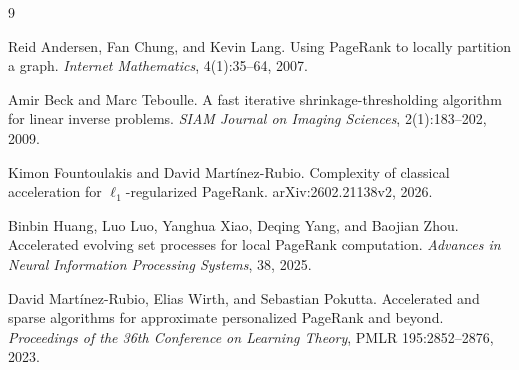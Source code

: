 \begin{thebibliography}{9}

Reid Andersen, Fan Chung, and Kevin Lang.
\newblock Using PageRank to locally partition a graph.
\newblock \emph{Internet Mathematics}, 4(1):35--64, 2007.

Amir Beck and Marc Teboulle.
\newblock A fast iterative shrinkage-thresholding algorithm for linear inverse
problems.
\newblock \emph{SIAM Journal on Imaging Sciences}, 2(1):183--202, 2009.

Kimon Fountoulakis and David Mart{\'i}nez-Rubio.
\newblock Complexity of classical acceleration for
$\ell_1$-regularized PageRank.
\newblock arXiv:2602.21138v2, 2026.

Binbin Huang, Luo Luo, Yanghua Xiao, Deqing Yang, and Baojian Zhou.
\newblock Accelerated evolving set processes for local PageRank computation.
\newblock \emph{Advances in Neural Information Processing Systems}, 38, 2025.

David Mart{\'i}nez-Rubio, Elias Wirth, and Sebastian Pokutta.
\newblock Accelerated and sparse algorithms for approximate personalized
PageRank and beyond.
\newblock \emph{Proceedings of the 36th Conference on Learning Theory},
PMLR 195:2852--2876, 2023.

\end{thebibliography}
